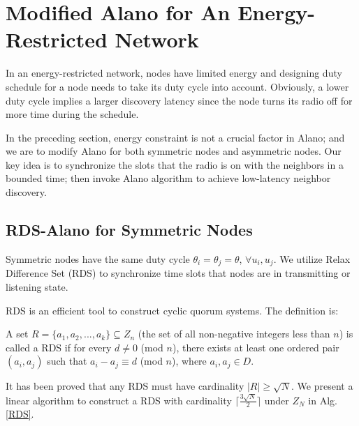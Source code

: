 \section{Modified Alano for An Energy-Restricted Network}
\label{EEN}
In an energy-restricted network, nodes have limited energy and designing duty schedule for a node needs to take its duty cycle into account. Obviously, a lower duty cycle implies a larger discovery latency since the node turns its radio off for more time during the schedule. 

In the preceding section, energy constraint is not a crucial factor in Alano; and we are to modify Alano for both symmetric nodes and asymmetric nodes.
Our key idea is to synchronize the slots that the radio is on with the neighbors in a bounded time; then invoke Alano algorithm to achieve low-latency neighbor discovery. 


\subsection{RDS-Alano for Symmetric Nodes}


Symmetric nodes have the same duty cycle $\theta_i = \theta_j = \theta$, $\forall u_i, u_j$. We utilize Relax Difference Set (RDS) to synchronize time slots that nodes are in transmitting or listening state.


RDS is an efficient tool to construct cyclic quorum systems\cite{jiang2005quorum,luk1997two}. The definition is:
\begin{definition}
A set $R=\{a_1,a_2,...,a_k\} \subseteq Z_n$ (the set of all non-negative integers less than $n$)
is called a RDS if for every $d \neq 0$ (mod $n$),
there exists at least one ordered pair $(a_i,a_j)$ such that $a_i - a_j \equiv d$ (mod $n$), where $a_i,a_j \in D$.
\end{definition}


It has been proved that any RDS must have cardinality $|R| \geq \sqrt{N}$\cite{luk1997two}.
We present a linear algorithm to construct a RDS with cardinality $\lceil \frac{3\sqrt{N}}{2}  \rceil$ under $Z_N$ in Alg. \ref{RDS}.


